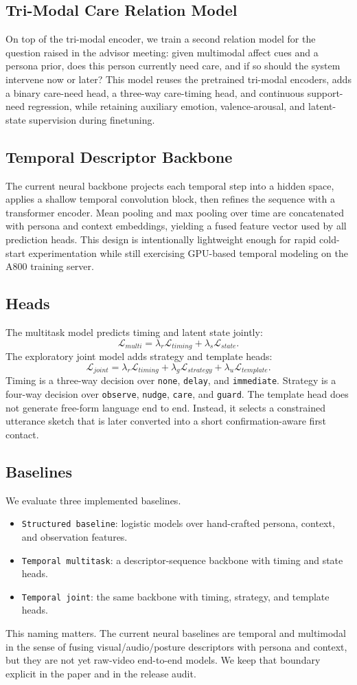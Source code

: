 \subsection{Tri-Modal Care Relation Model}
On top of the tri-modal encoder, we train a second relation model for the question raised in the advisor meeting: given multimodal affect cues and a persona prior, does this person currently need care, and if so should the system intervene now or later? This model reuses the pretrained tri-modal encoders, adds a binary care-need head, a three-way care-timing head, and continuous support-need regression, while retaining auxiliary emotion, valence-arousal, and latent-state supervision during finetuning.

\subsection{Temporal Descriptor Backbone}
The current neural backbone projects each temporal step into a hidden space, applies a shallow temporal convolution block, then refines the sequence with a transformer encoder. Mean pooling and max pooling over time are concatenated with persona and context embeddings, yielding a fused feature vector used by all prediction heads. This design is intentionally lightweight enough for rapid cold-start experimentation while still exercising GPU-based temporal modeling on the A800 training server.

\subsection{Heads}
The multitask model predicts timing and latent state jointly:
\[
\mathcal{L}_{multi} = \lambda_r \mathcal{L}_{timing} + \lambda_s \mathcal{L}_{state}.
\]
The exploratory joint model adds strategy and template heads:
\[
\mathcal{L}_{joint} = \lambda_r \mathcal{L}_{timing} + \lambda_g \mathcal{L}_{strategy} + \lambda_u \mathcal{L}_{template}.
\]
Timing is a three-way decision over \texttt{none}, \texttt{delay}, and \texttt{immediate}. Strategy is a four-way decision over \texttt{observe}, \texttt{nudge}, \texttt{care}, and \texttt{guard}. The template head does not generate free-form language end to end. Instead, it selects a constrained utterance sketch that is later converted into a short confirmation-aware first contact.

\subsection{Baselines}
We evaluate three implemented baselines.
\begin{itemize}[leftmargin=1.3em]
  \item \texttt{Structured baseline}: logistic models over hand-crafted persona, context, and observation features.
  \item \texttt{Temporal multitask}: a descriptor-sequence backbone with timing and state heads.
  \item \texttt{Temporal joint}: the same backbone with timing, strategy, and template heads.
\end{itemize}

This naming matters. The current neural baselines are temporal and multimodal in the sense of fusing visual/audio/posture descriptors with persona and context, but they are not yet raw-video end-to-end models. We keep that boundary explicit in the paper and in the release audit.
